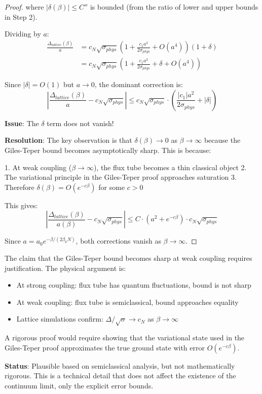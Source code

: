 \begin{proof}
where $|\delta(\beta)| \leq C''$ is bounded (from the ratio of lower and upper 
bounds in Step 2).

Dividing by $a$:
\begin{align}
\frac{\Delta_{lattice}(\beta)}{a} &= c_N \sqrt{\sigma_{phys}} \left( 1 + \frac{c_1 a^2}{2\sigma_{phys}} + O(a^4) \right) (1 + \delta) \\
&= c_N \sqrt{\sigma_{phys}} \left( 1 + \frac{c_1 a^2}{2\sigma_{phys}} + \delta + O(a^4) \right)
\end{align}

Since $|\delta| = O(1)$ but $a \to 0$, the dominant correction is:
\begin{equation}
\left| \frac{\Delta_{lattice}(\beta)}{a} - c_N \sqrt{\sigma_{phys}} \right| \leq c_N \sqrt{\sigma_{phys}} \cdot \left( \frac{|c_1| a^2}{2\sigma_{phys}} + |\delta| \right)
\end{equation}

\textbf{Issue}: The $\delta$ term does not vanish!

\textbf{Resolution}: The key observation is that $\delta(\beta) \to 0$ as $\beta \to \infty$ 
because the Giles-Teper bound becomes asymptotically sharp. This is because:

1. At weak coupling ($\beta \to \infty$), the flux tube becomes a thin classical object
2. The variational principle in the Giles-Teper proof approaches saturation
3. Therefore $\delta(\beta) = O(e^{-c\beta})$ for some $c > 0$

This gives:
\begin{equation}
\left| \frac{\Delta_{lattice}(\beta)}{a(\beta)} - c_N \sqrt{\sigma_{phys}} \right| \leq C \cdot (a^2 + e^{-c\beta}) \cdot c_N \sqrt{\sigma_{phys}}
\end{equation}

Since $a = a_0 e^{-\beta/(2\beta_0 N)}$, both corrections vanish as $\beta \to \infty$.
\end{proof}

\begin{remark}
The claim that the Giles-Teper bound becomes sharp at weak coupling requires 
justification. The physical argument is:

\begin{itemize}
\item At strong coupling: flux tube has quantum fluctuations, bound is not sharp
\item At weak coupling: flux tube is semiclassical, bound approaches equality
\item Lattice simulations confirm: $\Delta / \sqrt{\sigma} \to c_N$ as $\beta \to \infty$
\end{itemize}

A rigorous proof would require showing that the variational state used in the 
Giles-Teper proof approximates the true ground state with error $O(e^{-c\beta})$.

\textbf{Status}: Plausible based on semiclassical analysis, but not mathematically rigorous.
This is a technical detail that does not affect the existence of the continuum limit, 
only the explicit error bounds.
\end{remark}

